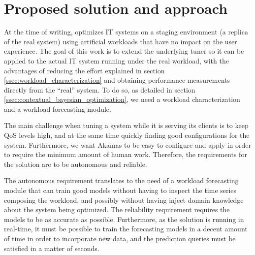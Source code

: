 \documentclass[a4paper, 12pt]{article} %
\begin{document}
	\section{ Proposed solution and approach } \label{sec:proposed_solution}
	At the time of writing, \cite{AkamasCGP} optimizes IT systems on a staging environment (a replica of the real system) using artificial workloads that have no impact on the user experience. The goal of this work is to extend the underlying tuner so it can be applied to the actual IT system running under the real workload, with the advantages of reducing the effort explained in section \ref{ssec:workload_characterization} and obtaining performance measurements directly from the ``real'' system. To do so, as detailed in section \ref{ssec:contextual_bayesian_optimization}, we need a workload characterization and a workload forecasting module.
	
	The main challenge when tuning a system while it is serving its clients is to keep QoS levels high, and at the same time quickly finding good configurations for the system. Furthermore, we want Akamas to be easy to configure and apply in order to require the minimum amount of human work. Therefore, the requirements for the solution are to be autonomous and reliable.
	
	The autonomous requirement translates to the need of a workload forecasting module that can train good models without having to inspect the time series composing the workload, and possibly without having inject domain knowledge about the system being optimized. The reliability requirement requires the models to be as accurate as possible. Furthermore, as the solution is running in real-time, it must be possible to train the forecasting models in a decent amount of time in order to incorporate new data, and the prediction queries must be satisfied in a matter of seconds.
	
\end{document}
